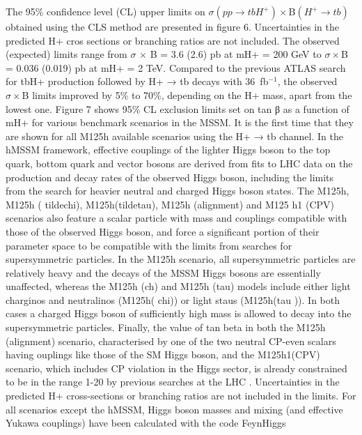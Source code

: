 The 95\% confidence level (CL) upper limits on $\sigma(pp\to tbH^+)\times$B$(H^+ \to tb)$ obtained using the CLS method are presented in figure 6. Uncertainties in the predicted H+ cros sections or branching ratios are not included. The observed (expected) limits range from $\sigma$ $\times$ B = 3.6 (2.6) pb at mH+ = 200 GeV to $\sigma\times$B = 0.036 (0.019) pb at mH+ = 2 TeV.  Compared to the previous ATLAS search for tbH+ production followed by H+ → tb decays with
36~fb$^{-1}$, the observed $\sigma\times$B limits improved by 5\% to 70\%, depending on the H+ mass,
apart from the lowest one. Figure 7 shows 95\% CL exclusion limits set on tan β as a function of mH+ for various
benchmark scenarios in the MSSM. It is the first time that they are shown for all M125h
available scenarios using the H+ → tb channel. In the hMSSM framework, effective couplings of the lighter Higgs boson to the top quark, bottom quark and vector bosons are
derived from fits to LHC data on the production and decay rates of the observed Higgs
boson, including the limits from the search for heavier neutral and charged Higgs boson
states. The M125h, M125h ( tildechi), M125h(tildetau), M125h (alignment) and M125 h1
(CPV) scenarios also feature a scalar particle with mass and couplings compatible with those of the observed Higgs
boson, and force a significant portion of their parameter space to be compatible with the
limits from searches for supersymmetric particles. In the M125h scenario, all supersymmetric particles are relatively heavy and the decays of the MSSM Higgs bosons are essentially unaffected, whereas the M125h (ch) and M125h (tau) models include either light charginos and neutralinos (M125h( chi)) or light staus (M125h(tau )). In both cases a charged Higgs boson of sufficiently high mass is allowed to decay into the supersymmetric particles. Finally, the
value of tan beta in both the M125h (alignment) scenario, characterised by one of the two neutral CP-even scalars having ouplings like those of the SM Higgs boson, and the M125h1(CPV) scenario, which includes CP violation in the Higgs sector, is already constrained to be in the range 1-20 by previous searches at the LHC %
. Uncertainties in the predicted H+
cross-sections or branching ratios are not included in the limits. For all scenarios except
the hMSSM, Higgs boson masses and mixing (and effective Yukawa couplings) have been
calculated with the code FeynHiggs %
